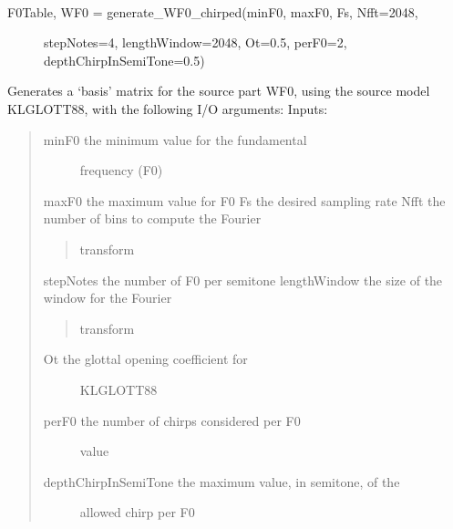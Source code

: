 \documentclass[letterpaper,10pt,english]{sphinxmanual}
\begin{document}

\begin{fulllineitems}
\label{reference/separateleadfunctions:pyfasst.SeparateLeadStereo.separateLeadFunctions.generate_WF0_chirped}~\begin{description}
\item[{F0Table, WF0 = generate\_WF0\_chirped(minF0, maxF0, Fs, Nfft=2048,}] \leavevmode
stepNotes=4, lengthWindow=2048,
Ot=0.5, perF0=2,
depthChirpInSemiTone=0.5)

\end{description}

Generates a `basis' matrix for the source part WF0, using the
source model KLGLOTT88, with the following I/O arguments:
Inputs:
\begin{quote}
\begin{description}
\item[{minF0                the minimum value for the fundamental}] \leavevmode
frequency (F0)

\end{description}

maxF0                the maximum value for F0
Fs                   the desired sampling rate
Nfft                 the number of bins to compute the Fourier
\begin{quote}

transform
\end{quote}

stepNotes            the number of F0 per semitone
lengthWindow         the size of the window for the Fourier
\begin{quote}

transform
\end{quote}
\begin{description}
\item[{Ot                   the glottal opening coefficient for}] \leavevmode
KLGLOTT88

\item[{perF0                the number of chirps considered per F0}] \leavevmode
value

\item[{depthChirpInSemiTone the maximum value, in semitone, of the}] \leavevmode
allowed chirp per F0


\end{description}
\end{quote}
\end{fulllineitems}
\end{document}
